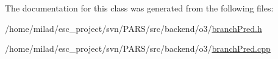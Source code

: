 \begin{DoxyCode}
                                         {
}
\end{DoxyCode}


The documentation for this class was generated from the following files:\begin{DoxyCompactItemize}
\item 
/home/milad/esc\_\-project/svn/PARS/src/backend/o3/\hyperlink{o3_2branchPred_8h}{branchPred.h}\item 
/home/milad/esc\_\-project/svn/PARS/src/backend/o3/\hyperlink{o3_2branchPred_8cpp}{branchPred.cpp}\end{DoxyCompactItemize}
